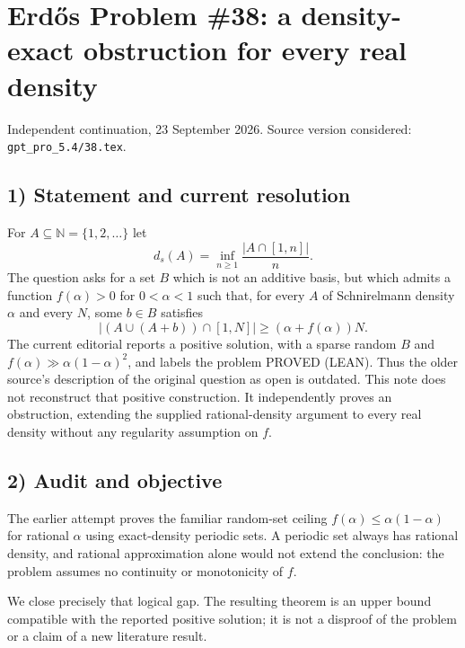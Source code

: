 \section{Erd\H{o}s Problem \#38: a density-exact obstruction for every real density}
\noindent Independent continuation, 23 September 2026. Source version considered: \texttt{gpt\_pro\_5.4/38.tex}.

\subsection*{1) Statement and current resolution}
For $A\subseteq\mathbb N=\{1,2,\ldots\}$ let
\[
 d_s(A)=\inf_{n\ge1}\frac{|A\cap[1,n]|}{n}.
\]
The question asks for a set $B$ which is not an additive basis, but which admits a function $f(\alpha)>0$ for $0<\alpha<1$ such that, for every $A$ of Schnirelmann density $\alpha$ and every $N$, some $b\in B$ satisfies
\[
 |(A\cup(A+b))\cap[1,N]|\ge(\alpha+f(\alpha))N.
\]
The current editorial reports a positive solution, with a sparse random $B$ and $f(\alpha)\gg\alpha(1-\alpha)^2$, and labels the problem PROVED (LEAN). Thus the older source's description of the original question as open is outdated. This note does not reconstruct that positive construction. It independently proves an obstruction, extending the supplied rational-density argument to every real density without any regularity assumption on $f$.

\subsection*{2) Audit and objective}
The earlier attempt proves the familiar random-set ceiling $f(\alpha)\le\alpha(1-\alpha)$ for rational $\alpha$ using exact-density periodic sets. A periodic set always has rational density, and rational approximation alone would not extend the conclusion: the problem assumes no continuity or monotonicity of $f$.

We close precisely that logical gap. The resulting theorem is an upper bound compatible with the reported positive solution; it is not a disproof of the problem or a claim of a new literature result.

